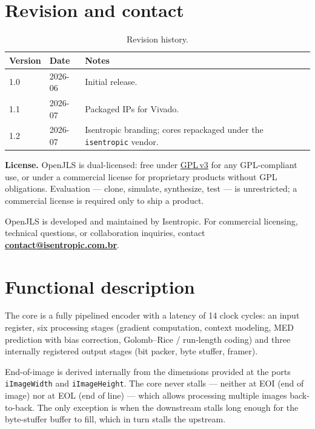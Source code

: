 \documentclass[10pt,a4paper]{article}
\begin{document}
\section{Revision and contact}
\begin{table}[H]
  \centering
  \caption{Revision history.}
  \label{tab:revision}
\begin{tabular}{@{}l l l@{}}
  \toprule
  \textbf{Version} & \textbf{Date} & \textbf{Notes} \\
  \midrule
  1.0 & 2026-06 & Initial release. \\
  1.1 & 2026-07 & Packaged IPs for Vivado. \\
  1.2 & 2026-07 & Isentropic branding; cores repackaged under the
  \texttt{isentropic} vendor. \\
  \bottomrule
\end{tabular}
\end{table}

\noindent\textbf{License.} OpenJLS is dual-licensed: free under
\href{https://www.gnu.org/licenses/gpl-3.0.html}{GPL\,v3} for any GPL-compliant
use, or under a commercial license for proprietary products without GPL
obligations. Evaluation --- clone, simulate, synthesize, test --- is
unrestricted; a commercial license is required only to ship a product.

\noindent OpenJLS is developed and maintained by Isentropic. For commercial
licensing, technical questions, or collaboration inquiries, contact
\textbf{\href{mailto:contact@isentropic.com.br}{contact\allowbreak @\allowbreak isentropic.com.br}}.

\section{Functional description}
The core is a fully pipelined encoder with a latency of 14 clock cycles: an
input register, six processing stages (gradient computation, context modeling,
MED prediction with bias correction, Golomb--Rice / run-length coding) and
three internally registered output stages (bit packer, byte stuffer, framer).

End-of-image is derived internally from the dimensions provided at the ports \texttt{iImageWidth} and \texttt{iImageHeight}.
The core never stalls --- neither at EOI (end of image) nor at EOL (end of line) --- which allows processing multiple images back-to-back.
The only exception is when the downstream stalls long enough for the byte-stuffer buffer to fill, which in turn stalls the upstream.
\end{document}
